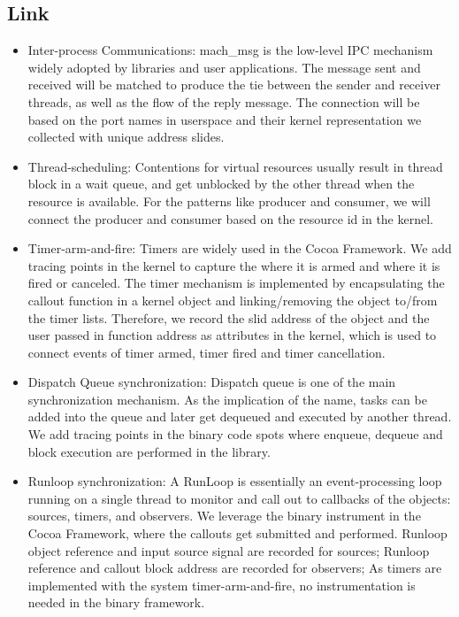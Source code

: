 \subsection{Link}
\begin{itemize}
        \item Inter-process Communications: mach\_msg is the low-level IPC mechanism widely adopted by libraries and user applications. The message sent and received will be matched to produce the tie between the sender and receiver threads, as well as the flow of the reply message. The connection will be based on the port names in userspace and their kernel representation we collected with unique address slides.
        \item Thread-scheduling: Contentions for virtual resources usually result in thread block in a wait queue, and get unblocked by the other thread when the resource is available. For the patterns like producer and consumer, we will connect the producer and consumer based on the resource id in the kernel. %
        \item Timer-arm-and-fire: Timers are widely used in the Cocoa Framework. We add tracing points in the kernel to capture the where it is armed and where it is fired or canceled. The timer mechanism is implemented by encapsulating the callout function in a kernel object and linking/removing the object to/from the timer lists. Therefore, we record the slid address of the object and the user passed in function address as attributes in the kernel, which is used to connect events of timer armed, timer fired and timer cancellation.
        \item Dispatch Queue synchronization: Dispatch queue is one of the main synchronization mechanism. As the implication of the name, tasks can be added into the queue and later get dequeued and executed by another thread. We add tracing points in the binary code spots where enqueue, dequeue and block execution are performed in the library.
        \item Runloop synchronization: A RunLoop is essentially an event-processing loop running on a single thread to monitor and call out to callbacks of the objects: sources, timers, and observers. We leverage the binary instrument in the Cocoa Framework, where the callouts get submitted and performed. Runloop object reference and input source signal are recorded for sources; Runloop reference and callout block address are recorded for observers; As timers are implemented with the system timer-arm-and-fire, no instrumentation is needed in the binary framework.

\end{itemize}
